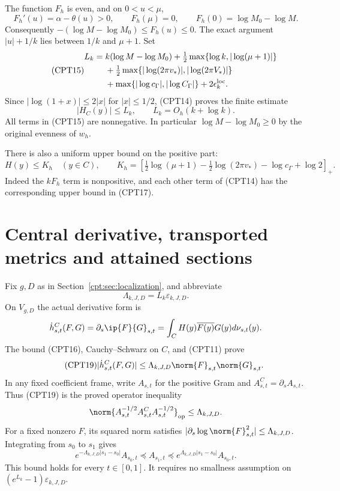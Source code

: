\documentclass[11pt,a4paper]{article}
\begin{document}
The function \(F_h\) is even, and on \(0<u<\mu\),
\[
 F_h'(u)=\alpha-\theta(u)>0,\qquad F_h(\mu)=0,\qquad
 F_h(0)=\log M_0-\log M.
\]
Consequently \(-(\log M-\log M_0)\le F_h(u)\le0\).
The exact argument \(|u|+1/k\) lies between \(1/k\) and \(\mu+1\).
Set
\begin{equation}\tag{CPT15}
\begin{split}
 L_k={}&k(\log M-\log M_0)
 +\tfrac12\max\{\log k,|\log(\mu+1)|\}\\
 &+\tfrac12\max\{|\log(2\pi v_*)|,|\log(2\pi V_*)|\}\\
 &+\max\{|\log c_\Gamma|,|\log C_\Gamma|\}
 +2\epsilon_k^{\rm loc}.
\end{split}
\end{equation}
Since \(|\log(1+x)|\le2|x|\) for \(|x|\le1/2\),
(CPT14) proves the finite estimate
\begin{equation}\tag{CPT16}
 |H_C(y)|\le L_k,\qquad L_k=O_h(k+\log k).
\end{equation}
All terms in (CPT15) are nonnegative.  In particular
\(\log M-\log M_0\ge0\) by the original evenness of \(w_h\).

There is also a uniform upper bound on the positive part:
\begin{equation}\tag{CPT17}
 H(y)\le K_h\quad(y\in C),\qquad
 K_h=\left[
 \tfrac12\log(\mu+1)-\tfrac12\log(2\pi v_*)
 -\log c_\Gamma+\log2\right]_+.
\end{equation}
Indeed the \(kF_h\) term is nonpositive, and each other term of
(CPT14) has the corresponding upper bound in (CPT17).

\section{Central derivative, transported metrics and attained sections}
\label{cpt:sec:sections}

Fix \(g,D\) as in Section~\ref{cpt:sec:localization}, and abbreviate
\begin{equation}\tag{CPT18}
 \Lambda_{k,J,D}=L_k\varepsilon_{k,J,D}.
\end{equation}
On \(V_{g,D}\) the actual derivative form is
\[
 \dot h^C_{s,t}(F,G)
 =\partial_s\ip{F}{G}_{s,t}
 =\int_C H(y)\overline{F(y)}G(y)d\nu_{s,t}(y).
\]
The bound (CPT16), Cauchy--Schwarz on \(C\), and (CPT11) prove
\begin{equation}\tag{CPT19}
 |\dot h^C_{s,t}(F,G)|
 \le\Lambda_{k,J,D}\norm{F}_{s,t}\norm{G}_{s,t}.
\end{equation}
In any fixed coefficient frame, write \(A_{s,t}\) for the
positive Gram and \(A^C_{s,t}=\partial_s A_{s,t}\).
Thus (CPT19) is the proved operator inequality
\[
 \norm{A_{s,t}^{-1/2}A^C_{s,t}A_{s,t}^{-1/2}}_{\rm op}
 \le\Lambda_{k,J,D}.
\]
For a fixed nonzero \(F\), its squared norm satisfies
\(|\partial_s\log\norm{F}_{s,t}^2|\le\Lambda_{k,J,D}\).
Integrating from \(s_0\) to \(s_1\) gives
\begin{equation}\tag{CPT20}
 e^{-\Lambda_{k,J,D}|s_1-s_0|}A_{s_0,t}
 \preceq A_{s_1,t}
 \preceq e^{\Lambda_{k,J,D}|s_1-s_0|}A_{s_0,t}.
\end{equation}
This bound holds for every \(t\in[0,1]\).
It requires no smallness assumption on
\((e^{L_k}-1)\varepsilon_{k,J,D}\).
\end{document}
